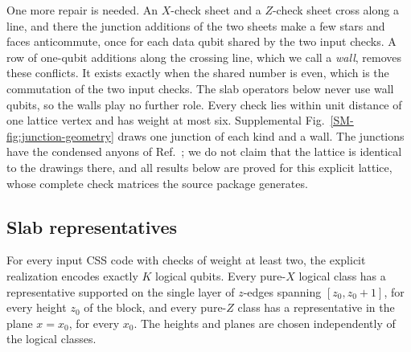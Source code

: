 One more repair is needed.  An $X$-check sheet and a $Z$-check sheet cross
along a line, and there the junction additions of the two sheets make a few
stars and faces anticommute, once for each data qubit shared by the two input
checks.  A row of one-qubit additions along the crossing line, which we call
a \emph{wall}, removes these conflicts.  It exists exactly when the shared
number is even, which is the commutation of the two input checks.  The slab
operators below never use wall qubits, so the walls play no further role.
Every check lies within unit distance of one lattice vertex and has weight at
most six.  Supplemental Fig.~\ref{SM-fig:junction-geometry} draws one junction
of each kind and a wall.  The junctions have the condensed anyons of
Ref.~\cite{WilliamsonBaspinLayerCodes}; we do not claim that the lattice is
identical to the drawings there, and all results below are proved for this
explicit lattice, whose complete check matrices the source package generates.

\subsection{Slab representatives}

\begin{theorem}
\label{thm:slabs}
For every input CSS code with checks of weight at least two, the explicit
realization encodes exactly $K$ logical qubits.  Every pure-$X$ logical class has a representative supported
on the single layer of $z$-edges spanning $[z_0,z_0+1]$, for every height
$z_0$ of the block, and every pure-$Z$ class has a representative in the plane
$x=x_0$, for every $x_0$.  The heights and planes are chosen independently of
the logical classes.
\end{theorem}

